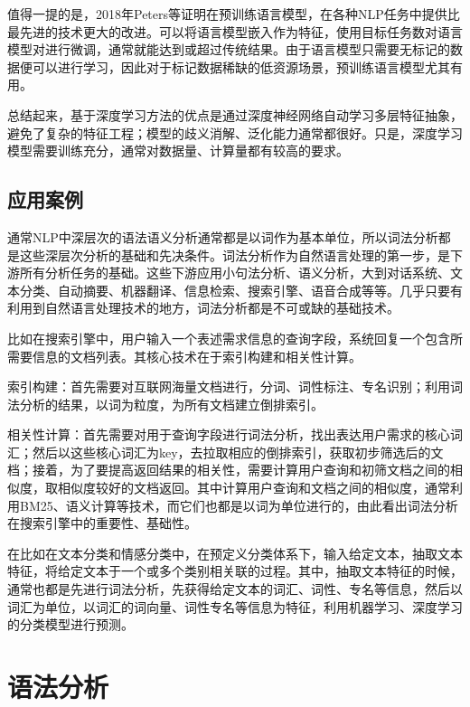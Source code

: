 值得一提的是，2018年Peters等证明在预训练语言模型\cite{conneau2017supervised}\cite{mccann2017learned}\cite{subramanian2018learning}，在各种NLP任务中提供比最先进的技术更大的改进。可以将语言模型嵌入作为特征，使用目标任务数对语言模型对进行微调\cite{ramachandran2016unsupervised}\cite{howard2018universal}，通常就能达到或超过传统结果。由于语言模型只需要无标记的数据便可以进行学习，因此对于标记数据稀缺的低资源场景，预训练语言模型尤其有用。

总结起来，基于深度学习方法的优点是通过深度神经网络自动学习多层特征抽象，避免了复杂的特征工程；模型的歧义消解、泛化能力通常都很好。只是，深度学习模型需要训练充分，通常对数据量、计算量都有较高的要求。

\subsection{应用案例}
通常NLP中深层次的语法语义分析通常都是以词作为基本单位，所以词法分析都是这些深层次分析的基础和先决条件。词法分析作为自然语言处理的第一步，是下游所有分析任务的基础。这些下游应用小句法分析、语义分析，大到对话系统、文本分类、自动摘要、机器翻译\cite{chang2008optimizing}、信息检索、搜索引擎、语音合成等等。几乎只要有利用到自然语言处理技术的地方，词法分析都是不可或缺的基础技术。

比如在搜索引擎中，用户输入一个表述需求信息的查询字段，系统回复一个包含所需要信息的文档列表。其核心技术在于索引构建和相关性计算。

索引构建：首先需要对互联网海量文档进行，分词、词性标注、专名识别；利用词法分析的结果，以词为粒度，为所有文档建立倒排索引。

相关性计算：首先需要对用于查询字段进行词法分析，找出表达用户需求的核心词汇；然后以这些核心词汇为key，去拉取相应的倒排索引，获取初步筛选后的文档；接着，为了要提高返回结果的相关性，需要计算用户查询和初筛文档之间的相似度，取相似度较好的文档返回。其中计算用户查询和文档之间的相似度，通常利用BM25、语义计算等技术，而它们也都是以词为单位进行的，由此看出词法分析在搜索引擎中的重要性、基础性。

在比如在文本分类和情感分类中，在预定义分类体系下，输入给定文本，抽取文本特征，将给定文本于一个或多个类别相关联的过程。其中，抽取文本特征的时候，通常也都是先进行词法分析，先获得给定文本的词汇、词性、专名等信息，然后以词汇为单位，以词汇的词向量、词性专名等信息为特征，利用机器学习、深度学习的分类模型进行预测。


\section{语法分析}

